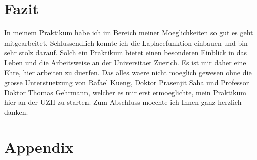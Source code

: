 \documentclass[pdftex,12pt,a4paper]{article}
\begin{document}
\clearpage
\section{Fazit}
In meinem Praktikum habe ich im Bereich meiner Moeglichkeiten so gut es geht mitgearbeitet.
Schlussendlich konnte ich die Laplacefunktion einbauen und bin sehr stolz darauf.
Solch ein Praktikum bietet einen besonderen Einblick in das Leben und die Arbeitsweise an der Universitaet Zuerich.
Es ist mir daher eine Ehre, hier arbeiten zu duerfen.
Das alles waere nicht moeglich gewesen ohne die grosse Unterstuetzung von Rafael Kueng, Doktor Prasenjit Saha und Professor Doktor Thomas Gehrmann,
welcher es mir erst ermoeglichte, mein Praktikum hier an der UZH zu starten.
Zum Abschluss moechte ich Ihnen ganz herzlich danken.

\newpage
\section{Appendix}
\end{document}
